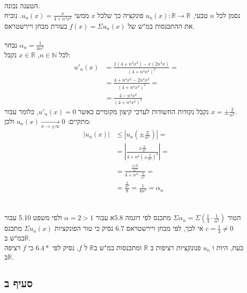 \documentclass{article}
\def\reals{\mathbb{R}}
\def\naturals{\mathbb{N}}
\begin{document}
הטענה נכונה. \\
נסמן לכל $n$ טבעי, $u_n(x): \reals\rightarrow\reals $ פונקציה כך שלכל $x$ ממשי $u_n(x)=\frac{x}{4+n^4x^2}$.
נוכיח את ההתכנסות במ"ש של $f(x)=\Sigma u_n(x)$ בעזרת מבחן ויירשטראס.\\\\
נבחר $\alpha_n=\frac{1}{4n^2}$ \\
לכל $n\in \naturals$, $x\in \reals$ נקבל:
\begin{align*}
    u'_n(x) & =\frac{1(4+n^4x^2)-x(2n^4x)}{(4+n^4x^2)^2}= \\
            & =\frac{4+n^4x^2-2n^4x^2}{(4+n^4x^2)^2}=     \\
            & =\frac{4-n^4x^2}{(4+n^4x^2)^2}
\end{align*}
נקבל נקודות החשודות לערכי קיצון מקומיים כאשר $u'_n(x)=0$, כלומר עבור $x=\pm \frac{2}{n^2}$. \\
מתקיים: $u_n(x)\xrightarrow[x\rightarrow \pm \infty]{}0$ ולכן:
\begin{align*}
    |u_n(x)| & \leq |u_n(\pm \frac{2}{n^2})|=                           \\
             & =|\frac{\pm \frac{2}{n^2}}{4+n^4(\pm \frac{2}{n^2})^2}|= \\
             & =\frac{\frac{|\pm 2|}{n^2}}{4+n^4\cdot \frac{4}{n^4}}=   \\
             & =\frac{\frac{2}{n^2}}{8}=\frac{1}{4n^2}=\alpha_n
\end{align*}
\\\\
הטור $\Sigma \alpha_n=\Sigma (\frac{1}{4} \cdot \frac{1}{n^2})$ מתכנס לפי דוגמה $5.8$א עבור $\alpha=2>1$ ולפי משפט 5.10 עבור $c=\frac{1}{4}\ne 0$
אי לכך, לפי מבחן ויירשטראס 6.7 נסיק כי טור הפונקציות $\Sigma u_n(x)$ מתכנס במ"ש ב$\reals$.\\
כעת, היות ו $u_n$ פנונקציות רציפות ב $\reals$ ומתכנסות במ"ש ב$\reals$ ל $f$, נסיק לפי $6.4*$ כי $f$ רציפה ב$\reals$.

\subsection*{סעיף ב}
\end{document}
